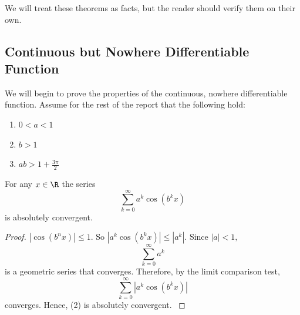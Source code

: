 \documentclass[fontsize=14pt]{scrartcl}
\begin{document}
We will treat these theorems as facts, but the reader should verify them on their own.

\subsection*{Continuous but Nowhere Differentiable Function} \cite{MITRealAnalysisLecture18}
We will begin to prove the properties of the continuous, nowhere differentiable function. Assume for the rest of the report that the following hold:

\begin{enumerate}[label=(\roman*)]
    \item $0 < a < 1$
    \item $b > 1$
    \item $ab > 1 + \frac{3\pi}{2}$
\end{enumerate}

\begin{theorem}
    For any $x \in \R$ the series
    \begin{equation}
        \sum_{k=0}^{\infty} a^k \cos(b^k x)
    \end{equation}
    is absolutely convergent.
\end{theorem}

\begin{proof}
    $|\cos(b^n x)| \leq 1$. So
    $| a^k \cos(b^k x)| \leq |a^k|$. Since $|a| < 1, $
    \begin{equation}
        \sum_{k=0}^{\infty} a^k
    \end{equation}
    is a geometric series that converges. Therefore, by the limit comparison test, 
    \begin{equation}
        \sum_{k=0}^{\infty} |a^k \cos(b^k x)|
    \end{equation}
    converges. Hence, (2) is absolutely convergent. \cite{MITRealAnalysisLecture18}
\end{proof}

\newpage
\end{document}
